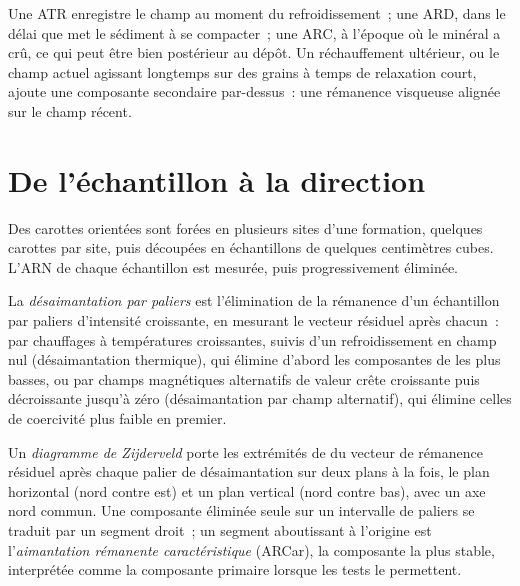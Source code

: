 Une ATR enregistre le champ au moment du refroidissement~; une ARD, dans le délai que
met le sédiment à se compacter~; une ARC, à l'époque où le minéral a crû, ce qui peut
être bien postérieur au dépôt. Un réchauffement ultérieur, ou le champ actuel agissant longtemps
sur des grains à temps de relaxation court, ajoute une composante secondaire par-dessus~: une
rémanence visqueuse alignée sur le champ récent.

\section{De l'échantillon à la direction}

Des carottes orientées sont forées en plusieurs sites d'une formation, quelques carottes par
site, puis découpées en échantillons de quelques centimètres cubes. L'ARN de chaque échantillon est
mesurée, puis progressivement éliminée.

\begin{definition}\label{def:b3:palaeomagnetism:demag}
La \emph{désaimantation par paliers} est l'élimination
de la rémanence d'un échantillon par paliers d'intensité croissante, en mesurant le
vecteur résiduel après chacun~: par chauffages à températures croissantes, suivis d'un refroidissement
en champ nul (désaimantation thermique), qui élimine d'abord les composantes de
 les plus basses, ou par champs magnétiques alternatifs de valeur crête
croissante puis décroissante jusqu'à zéro (désaimantation par champ alternatif), qui élimine
celles de coercivité plus faible en premier.
\end{definition}

\begin{definition}\label{def:b3:palaeomagnetism:zijderveld}
Un \emph{diagramme de Zijderveld} porte les extrémités de
du vecteur de rémanence résiduel après chaque palier de désaimantation sur deux plans
à la fois, le plan horizontal (nord contre est) et un plan vertical (nord
contre bas), avec un axe nord commun. Une composante éliminée seule sur un intervalle
de paliers se traduit par un segment droit~; un segment aboutissant à l'origine est
l'\emph{aimantation rémanente caractéristique}
(ARCar), la composante la plus stable, interprétée comme la composante primaire
lorsque les tests le permettent.
\end{definition}

